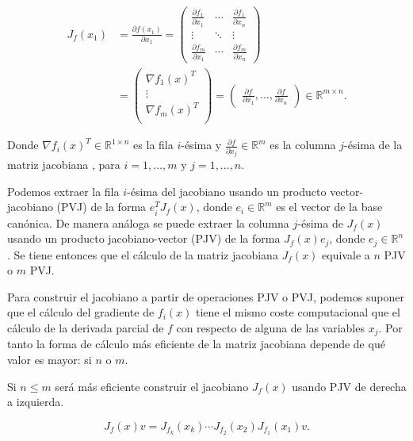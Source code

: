\begin{align*}
	J_f(x_1)&=\frac{\partial f(x_1)}{\partial x_1} =
	\begin{pmatrix}
	\frac{\partial f_1}{\partial x_1} & \cdots & \frac{\partial f_1}{\partial x_n} \\	
	\vdots & \ddots & \vdots \\
	\frac{\partial f_m}{\partial x_1} & \cdots & \frac{\partial f_m}{\partial x_n} 
	\end{pmatrix} \\
	&= 
	\begin{pmatrix}
	 \nabla f_1(x)^T\\
	 \vdots \\
	 \nabla f_m(x)^T \\
	\end{pmatrix}=
	\begin{pmatrix}
	     \frac{\partial f}{\partial x_1}, \ldots, \frac{\partial f}{\partial x_n}
	\end{pmatrix} \in \mathbb{R}^{m \times n}.
\end{align*}





Donde $\nabla f_i(x) ^T \in \mathbb{R}^{1 \times n} $ es la fila $i$-ésima y $\frac{\partial f}{\partial x_j} \in \mathbb{R}^m$ es la columna $j$-ésima de la matriz jacobiana , para $i=1,\ldots,m$ y $j=1,\ldots,n$.

Podemos extraer la fila $i$-ésima del jacobiano usando un producto vector-jacobiano (PVJ) de la forma $e_i^T J_f(x)$, donde $e_i \in \mathbb{R}^m$ es el vector de la base canónica. De manera análoga se puede extraer la columna $j$-ésima de $J_f(x)$ usando un producto jacobiano-vector (PJV) de la forma $J_f(x)e_j$, donde $e_j \in \mathbb{R}^n$. Se tiene entonces que el cálculo de la matriz jacobiana $J_f(x)$ equivale a $n$ PJV o $m$ PVJ. 


Para construir el jacobiano a partir de operaciones PJV o PVJ, podemos suponer que el cálculo del gradiente de $f_i(x)$ tiene el mismo coste computacional que el cálculo de la derivada parcial de $f$ con respecto de alguna de las variables $x_j$. Por tanto la forma de cálculo más eficiente de la matriz jacobiana depende de qué valor es mayor: si $n$ o $m$.



Si $n\leq m$ será más eficiente construir el jacobiano $J_f(x)$ usando PJV de derecha a izquierda.

$$J_f(x)v=J_{f_k}(x_k) \cdots J_{f_2}(x_2) J_{f_1}(x_1) v.$$

